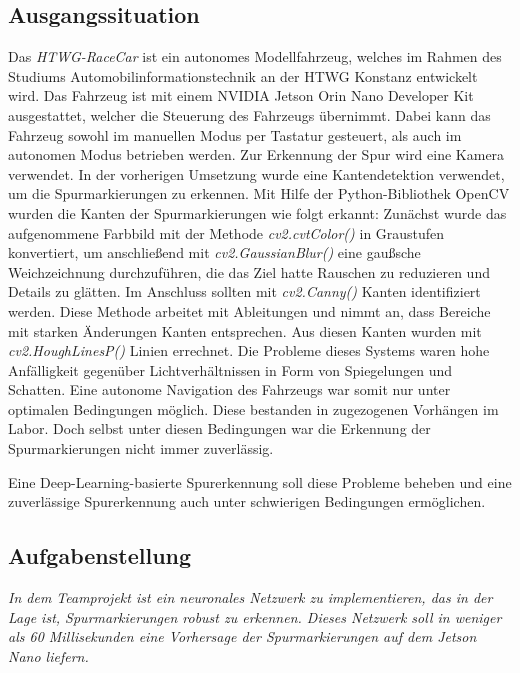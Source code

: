 \documentclass{article}
\begin{document}
        \subsection{Ausgangssituation}
            Das \textit{HTWG-RaceCar} ist ein autonomes Modellfahrzeug, welches im Rahmen des Studiums Automobilinformationstechnik an der HTWG Konstanz entwickelt wird.
            Das Fahrzeug ist mit einem NVIDIA Jetson Orin Nano Developer Kit
            ausgestattet, welcher die Steuerung des Fahrzeugs übernimmt.
            Dabei kann das Fahrzeug sowohl im manuellen Modus per Tastatur gesteuert, als auch im autonomen Modus betrieben werden.
            Zur Erkennung der Spur wird eine Kamera verwendet. %
            In der vorherigen Umsetzung wurde eine Kantendetektion verwendet, um die Spurmarkierungen zu erkennen.
            Mit Hilfe der Python-Bibliothek OpenCV wurden die Kanten der Spurmarkierungen wie folgt erkannt:
            Zunächst wurde das aufgenommene Farbbild mit der Methode \textit{cv2.cvtColor()} in Graustufen konvertiert, um anschließend mit \textit{cv2.GaussianBlur()} eine gaußsche Weichzeichnung durchzuführen, die das Ziel hatte Rauschen zu reduzieren und Details zu glätten. Im Anschluss sollten mit \textit{cv2.Canny()} Kanten identifiziert werden. Diese Methode arbeitet mit Ableitungen und nimmt an, dass Bereiche mit starken Änderungen Kanten entsprechen.
            Aus diesen Kanten wurden mit \textit{cv2.HoughLinesP()} Linien errechnet. 
            Die Probleme dieses Systems waren hohe Anfälligkeit gegenüber Lichtverhältnissen in Form von Spiegelungen und Schatten.
            Eine autonome Navigation des Fahrzeugs war somit nur unter optimalen Bedingungen möglich. Diese bestanden in zugezogenen Vorhängen im Labor.
            Doch selbst unter diesen Bedingungen war die Erkennung der Spurmarkierungen nicht immer zuverlässig.

            Eine Deep-Learning-basierte Spurerkennung soll diese Probleme beheben und eine zuverlässige Spurerkennung auch unter schwierigen Bedingungen ermöglichen.

 

        \subsection{Aufgabenstellung}
            \textit{In dem Teamprojekt ist ein neuronales Netzwerk zu implementieren, das in der Lage ist, Spurmarkierungen robust zu erkennen. Dieses Netzwerk soll in weniger als 60 Millisekunden eine Vorhersage der Spurmarkierungen auf dem Jetson Nano liefern.}
\end{document}
